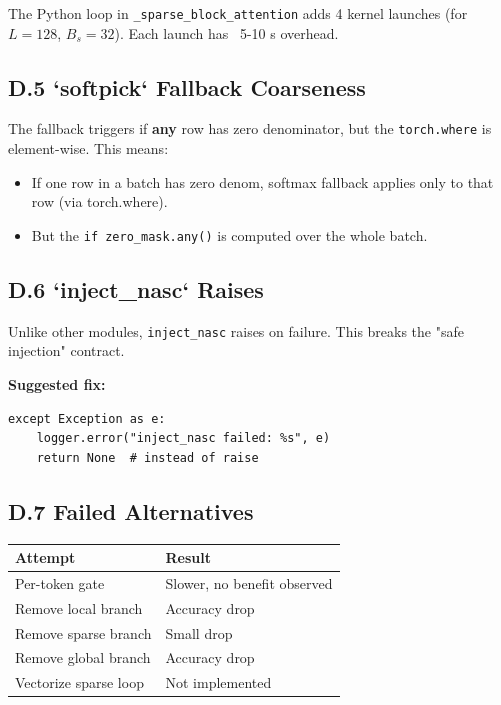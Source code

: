 The Python loop in \texttt{\_sparse\_block\_attention} adds 4 kernel launches 
(for $L = 128$, $B_s = 32$). Each launch has ~5-10  s overhead.

\subsection{D.5 `softpick` Fallback Coarseness}

The fallback triggers if \textbf{any} row has zero denominator, but the 
\texttt{torch.where} is element-wise. This means:
\begin{itemize}
\item If one row in a batch has zero denom, softmax fallback applies only to
  that row (via torch.where).
\item But the \texttt{if zero\_mask.any()} is computed over the whole batch.

\end{itemize}
\subsection{D.6 `inject\_nasc` Raises}

Unlike other modules, \texttt{inject\_nasc} raises on failure. This breaks the 
"safe injection" contract.

\textbf{Suggested fix:}

\begin{lstlisting}
except Exception as e:
    logger.error("inject_nasc failed: %s", e)
    return None  # instead of raise
\end{lstlisting}

\subsection{D.7 Failed Alternatives}

\begin{table}[H]
\centering
\small
\begin{tabular}{ll}
\toprule
\textbf{Attempt} & \textbf{Result} \\
\midrule
Per-token gate & Slower, no benefit observed \\
Remove local branch & Accuracy drop \\
Remove sparse branch & Small drop \\
Remove global branch & Accuracy drop \\
Vectorize sparse loop & Not implemented \\
\bottomrule
\end{tabular}
\end{table}

